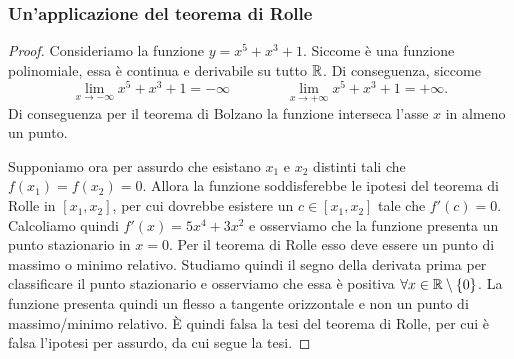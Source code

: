     \subsubsection{Un'applicazione del teorema di Rolle}
    \begin{ex}
        [Dimostrare che il grafico della funzione $y=x^5+x^3+1$ interseca l'asse $x$ in un solo punto.]
        \begin{proof}
            Consideriamo la funzione $y=x^5+x^3+1$. Siccome è una funzione polinomiale, essa è continua e derivabile su tutto $\mathbb{R}$. Di conseguenza, siccome
            \[\lim_{x\to-\infty}x^5+x^3+1=-\infty\qquad \qquad \lim_{x\to+\infty}x^5+x^3+1=+\infty.\]
            Di conseguenza per il teorema di Bolzano la funzione interseca l'asse $x$ in almeno un punto.

            Supponiamo ora per assurdo che esistano $x_1$ e $x_2$ distinti tali che $f(x_1)=f(x_2)=0$. Allora la funzione soddisferebbe le ipotesi del teorema di Rolle  in $[x_1,x_2]$, per cui dovrebbe esistere un $c\in [x_1,x_2]$ tale che $f'(c)=0$. Calcoliamo quindi $f'(x)=5x^4+3x^2$ e osserviamo che la funzione presenta un punto stazionario in $x=0$. Per il teorema di Rolle esso deve essere un punto di massimo o minimo relativo. Studiamo quindi il segno della derivata prima per classificare il punto stazionario e osserviamo che essa è positiva $\forall x \in \mathbb{R} \setminus \{0\}$. La funzione presenta quindi un flesso a tangente orizzontale e non un punto di massimo/minimo relativo. È quindi falsa la tesi del teorema di Rolle, per cui è falsa l'ipotesi per assurdo, da cui segue la tesi.
        \end{proof}
    \end{ex}
